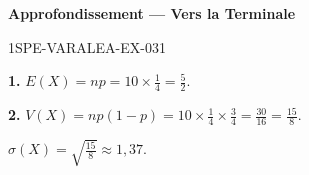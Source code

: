 \begin{center}\textbf{Approfondissement — Vers la Terminale}\end{center}
\begin{corrige}{1SPE-VARALEA-EX-031}

\textbf{1.} $E(X) = np = 10 \times \frac{1}{4} = \frac{5}{2}$.

\medskip
\textbf{2.} $V(X) = np(1-p) = 10 \times \frac{1}{4} \times \frac{3}{4} = \frac{30}{16} = \frac{15}{8}$.

$\sigma(X) = \sqrt{\frac{15}{8}} \approx 1{,}37$.

\end{corrige}
